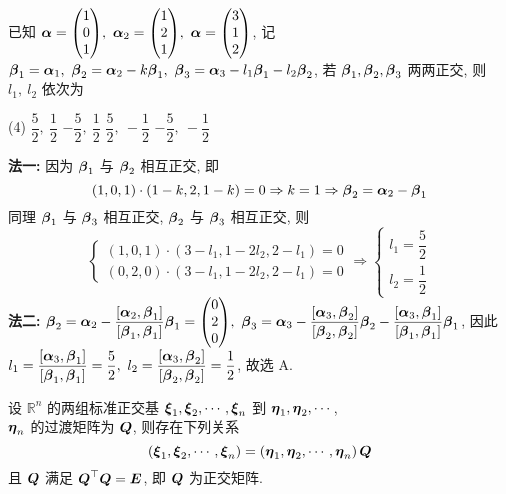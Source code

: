 \begin{example}[2021 数一]
    已知 $\vb*{\alpha}=\mqty(1\\0\\1),~\vb*{\alpha}_2=\mqty(1\\2\\1),~\vb*{\alpha}=\mqty(3\\1\\2)$, 记 $\vb*{\beta}_1=\vb*{\alpha}_1,~\vb*{\beta}_2=\vb*{\alpha}_2-k\vb*{\beta}_1,~\vb*{\beta}_3=\vb*{\alpha}_3-l_1\vb*{\beta}_1-l_2\vb*{\beta}_2$,
    若 $\vb*{\beta}_1,\vb*{\beta}_2,\vb*{\beta}_3$ 两两正交, 则 $l_1,~l_2$ 依次为
    \begin{tasks}(4)
        \task $\dfrac{5}{2},~\dfrac{1}{2}$
        \task $-\dfrac{5}{2},~\dfrac{1}{2}$
        \task $\dfrac{5}{2},~-\dfrac{1}{2}$
        \task $-\dfrac{5}{2},~-\dfrac{1}{2}$
    \end{tasks}
\end{example}
\begin{solution}
    \textbf{法一: }因为 $\vb*{\beta}_1$ 与 $\vb*{\beta}_2$ 相互正交, 即 $$(1,0,1)\cdot(1-k,2,1-k)=0\Rightarrow k=1\Rightarrow \vb*{\beta}_2=\vb*{\alpha}_2-\vb*{\beta}_1$$
    同理 $\vb*{\beta}_1$ 与 $\vb*{\beta}_3$ 相互正交, $\vb*{\beta}_2$ 与 $\vb*{\beta}_3$ 相互正交, 则
    $$\begin{cases}
            (1,0,1)\cdot(3-l_1,1-2l_2,2-l_1)=0 \\
            (0,2,0)\cdot(3-l_1,1-2l_2,2-l_1)=0
        \end{cases}\Rightarrow \begin{cases}
            l_1=\dfrac{5}{2} \\[6pt]
            l_2=\dfrac{1}{2}
        \end{cases}$$
    \textbf{法二: }$\vb*{\beta}_2=\vb*{\alpha}_2-\dfrac{[\vb*{\alpha}_2,\vb*{\beta}_1]}{[\vb*{\beta}_1,\vb*{\beta}_1]}\vb*{\beta}_1=\mqty(0\\2\\0),~\vb*{\beta}_3=\vb*{\alpha}_3-\dfrac{[\vb*{\alpha}_3,\vb*{\beta}_2]}{[\vb*{\beta}_2,\vb*{\beta}_2]}\vb*{\beta}_2-\dfrac{[\vb*{\alpha}_3,\vb*{\beta}_1]}{[\vb*{\beta}_1,\vb*{\beta}_1]}\vb*{\beta}_1$,
    因此 $l_1=\dfrac{[\vb*{\alpha}_3,\vb*{\beta}_1]}{[\vb*{\beta}_1,\vb*{\beta}_1]}=\dfrac{5}{2},~l_2=\dfrac{[\vb*{\alpha}_3,\vb*{\beta}_2]}{[\vb*{\beta}_2,\vb*{\beta}_2]}=\dfrac{1}{2}$,
    故选 A.
\end{solution}

\begin{theorem}[两组标准正交基之间的过渡矩阵]
    设 $ \mathbb{R}^{n} $ 的两组标准正交基 $ \vb*{\xi}_{1}, \vb*{\xi}_{2}, \cdots, \vb*{\xi}_{n} $ 到 $ \vb*{\eta}_{1} ,  \vb*{\eta}_{2}, \cdots$,\\ $\vb*{\eta}_{n} $ 的过渡矩阵为 $ \vb*{Q} $, 则存在下列关系
    $$\left(\vb*{\xi}_{1}, \vb*{\xi}_{2}, \cdots, \vb*{\xi}_{n}\right)=\left(\vb*{\eta}_{1}, \vb*{\eta}_{2}, \cdots, \vb*{\eta}_{n}\right) \vb*{Q}$$
    且 $ \vb*{Q} $ 满足 $ \vb*{Q}^{\top} \vb*{Q}=\vb*{E} $, 即 $ \vb*{Q} $ 为正交矩阵.
\end{theorem}

